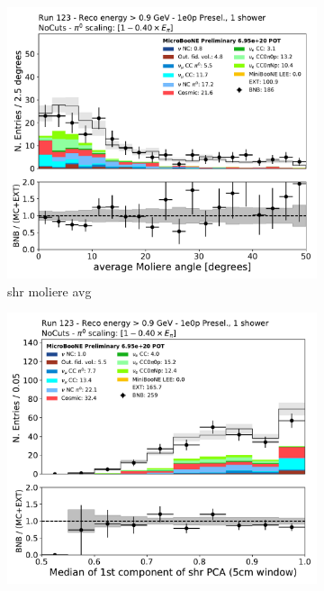 \begin{figure}[H]
    \centering
    \begin{subfigure}{0.3\textwidth}
    \includegraphics[width=1.0\textwidth]{1e0p/High_E_Sideband/shrmoliereavg.pdf}
    \caption{shr moliere avg}
    \end{subfigure}
    \begin{subfigure}{0.3\textwidth}
    \includegraphics[width=1.0\textwidth]{1e0p/High_E_Sideband/shrPCA1CMed_5cm.pdf}

\end{subfigure}
\end{figure}
